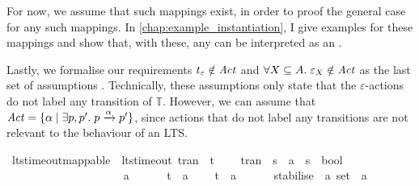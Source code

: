 \begin{isabellebody}
\begin{isamarkuptext}
For now, we assume that such mappings exist, in order to proof the general case for any such mappings. In \cref{chap:example_instantiation}, I give examples for these mappings and show that, with these, any  can be interpreted as an .

Lastly, we formalise our requirements $t_\varepsilon \notin \mathit{Act}$ and $\forall X \subseteq A.\; \varepsilon_X \notin \mathit{Act}$ as the last set of assumptions . Technically, these assumptions only state that the $\varepsilon$-actions do not label any transition of $\mathbb{T}$. However, we can assume that 
$\mathit{Act} = \{ \alpha \mid \exists p, p'.\; p \xrightarrow{\alpha} p' \}$, 
since actions that do not label any transitions are not relevant to the behaviour of an LTS.%
\end{isamarkuptext}\isamarkuptrue%
\isamarkupfalse%
\ lts{\isacharunderscore}{\kern0pt}timeout{\isacharunderscore}{\kern0pt}mappable\ {\isacharequal}{\kern0pt}\ lts{\isacharunderscore}{\kern0pt}timeout\ tran\ {\isasymtau}\ t\ \isanewline
\ \ \ tran\ {\isacharcolon}{\kern0pt}{\isacharcolon}{\kern0pt}\ {\isachardoublequoteopen}{\isacharprime}{\kern0pt}s\ {\isasymRightarrow}\ {\isacharprime}{\kern0pt}a\ {\isasymRightarrow}\ {\isacharprime}{\kern0pt}s\ {\isasymRightarrow}\ bool{\isachardoublequoteclose}\ \isanewline
\ \ \ \ \ \ {\isacharparenleft}{\kern0pt}{\isachardoublequoteopen}{\isacharunderscore}{\kern0pt}\ {\isasymlongmapsto}{\isacharunderscore}{\kern0pt}\ {\isacharunderscore}{\kern0pt}{\isachardoublequoteclose}\ {\isacharbrackleft}{\kern0pt}{}{}{\isacharcomma}{\kern0pt}\ {}{}{\isacharcomma}{\kern0pt}\ {}{}{\isacharbrackright}{\kern0pt}\ {}{}{\isacharparenright}{\kern0pt}\ \isanewline
\ \ \ \ \ {\isasymtau}\ {\isacharcolon}{\kern0pt}{\isacharcolon}{\kern0pt}\ {\isacharprime}{\kern0pt}a\ \isanewline
\ \ \ \ \ t\ {\isacharcolon}{\kern0pt}{\isacharcolon}{\kern0pt}\ {\isacharprime}{\kern0pt}a\ {\isacharplus}{\kern0pt}\isanewline
\ \ \ t{\isacharunderscore}{\kern0pt}{\isasymepsilon}\ {\isacharcolon}{\kern0pt}{\isacharcolon}{\kern0pt}\ {\isacharprime}{\kern0pt}a\ \isanewline
\ \ \ \ \ stabilise\ {\isacharcolon}{\kern0pt}{\isacharcolon}{\kern0pt}\ {\isacartoucheopen}{\isacharprime}{\kern0pt}a\ set\ {\isasymRightarrow}\ {\isacharprime}{\kern0pt}a{\isacartoucheclose}\ \isanewline

\end{isabellebody}
